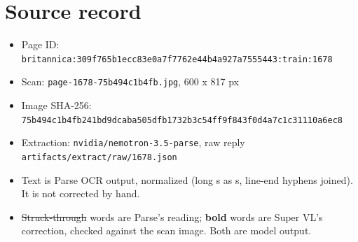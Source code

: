 \documentclass[10pt]{article}
\begin{document}
\section*{Source record}
\begin{itemize}
\item Page ID: \texttt{britannica:309f765b1ecc83e0a7f7762e44b4a927a7555443:train:1678}
\item Scan: \texttt{page-1678-75b494c1b4fb.jpg}, 600 x 817 px
\item Image SHA-256: \texttt{\small 75b494c1b4fb241bd9dcaba505dfb1732b3c54ff9f843f0d4a7c1c31110a6ec8}
\item Extraction: \texttt{nvidia/nemotron-3.5-parse}, raw reply \texttt{artifacts/extract/raw/1678.json}
\item Text is Parse OCR output, normalized (long s as s, line-end hyphens joined). It is not corrected by hand.
\item \sout{Struck-through} words are Parse's reading; \textbf{bold} words are Super VL's correction, checked against the scan image. Both are model output.
\end{itemize}
\end{document}
